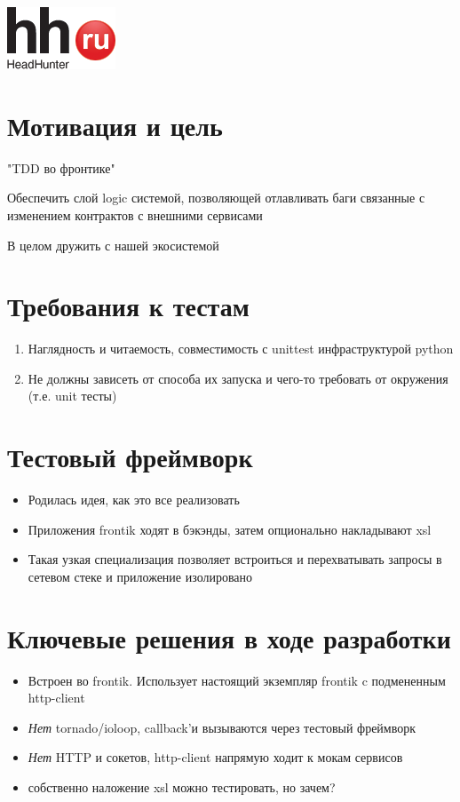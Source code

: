 \documentclass[12pt]{article}
\begin{document}
\includegraphics{logo.png}
\TitleSlide

\section{Мотивация и цель}
"TDD во фронтике"

Обеспечить слой logic системой, позволяющей отлавливать баги связанные с изменением контрактов с внешними сервисами

В целом дружить с нашей экосистемой

\section{Требования к тестам}

\begin{enumerate}
\item Наглядность и читаемость, совместимость с unittest инфраструктурой python
\item Не должны зависеть от способа их запуска и чего-то требовать от окружения (т.е. unit тесты)
\end{enumerate}

\section{Тестовый фреймворк}

\begin{itemize}
\item Родилась идея, как это все реализовать
\item Приложения frontik ходят в бэкэнды, затем опционально накладывают xsl
\item Такая узкая специализация позволяет встроиться и перехватывать запросы в сетевом стеке и приложение изолировано


\end{itemize}

\section{Ключевые решения в ходе разработки}

\begin{itemize}
\item Встроен во frontik. Использует настоящий экземпляр frontik c подмененным http-client
\item \emph{Нет} tornado/ioloop, callback'и вызываются через тестовый фреймворк
\item \emph{Нет} HTTP и сокетов, http-client напрямую ходит к мокам сервисов
\item собственно наложение xsl можно тестировать, но зачем?

\end{itemize}
\end{document}
